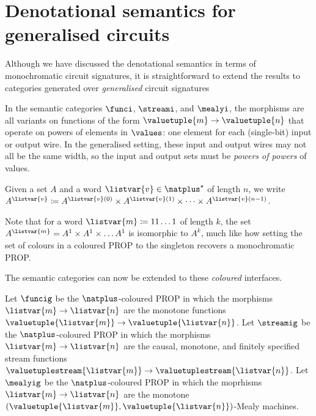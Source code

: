 \section{Denotational semantics for generalised circuits}

Although we have discussed the denotational semantics in terms of monochromatic
circuit signatures, it is straightforward to extend the results to categories
generated over \emph{generalised} circuit signatures

In the semantic categories \(\funci\), \(\streami\), and \(\mealyi\), the
morphisms are all variants on functions of the form
\(\valuetuple{m} \to \valuetuple{n}\) that operate on powers of elements in
\(\values\): one element for each (single-bit) input or output wire.
In the generalised setting, these input and output wires may not all be the
same width, so the input and output sets must be \emph{powers of powers} of
values.

\begin{notation}
    Given a set \(A\) and a word \(\listvar{v} \in \natplus^\star\) of
    length \(n\), we write \(
    A^{\listvar{v}}
    \coloneqq
    A^{\listvar{v}(0)}
    \times
    A^{\listvar{v}(1)}
    \times
    \dots
    \times
    A^{\listvar{v}(n-1)}
    \).
\end{notation}

Note that for a word \(\listvar{m} \coloneqq 11\dots1\) of length \(k\), the set
\(A^{\listvar{m}} = A^1 \times A^1 \times \dots A^1\) is isomorphic to \(A^k\),
much like how setting the set of colours in a coloured PROP to the singleton
recovers a monochromatic PROP.

The semantic categories can now be extended to these \emph{coloured} interfaces.

\begin{definition}
    Let \(\funcig\) be the \(\natplus\)-coloured PROP in which the morphisms
    \(\listvar{m} \to \listvar{n}\) are the monotone functions
    \(\valuetuple{\listvar{m}} \to \valuetuple{\listvar{n}}\).
    Let \(\streamig\) be the \(\natplus\)-coloured PROP in which the morphisms
    \(\listvar{m} \to \listvar{n}\) are the causal, monotone, and finitely
    specified stream functions \(
    \valuetuplestream{\listvar{m}} \to \valuetuplestream{\listvar{n}}
    \).
    Let \(\mealyig\) be the \(\natplus\)-coloured PROP in which the moprhisms
    \(\listvar{m} \to \listvar{n}\) are the monotone
    \((\valuetuple{\listvar{m}}, \valuetuple{\listvar{n}})\)-Mealy machines.
\end{definition}


